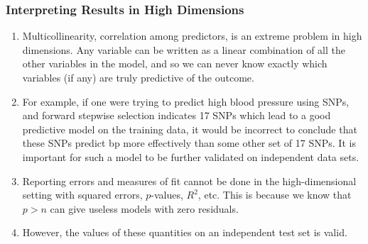 \documentclass[10pt]{article}
\begin{document}
\subsubsection{Interpreting Results in High Dimensions}
\begin{enumerate}
	\item Multicollinearity, correlation among predictors, is an extreme problem in high dimensions.  Any variable can be written as a linear combination of all the other variables in the model, and so we can never know exactly which variables (if any) are truly predictive of the outcome.
	\item For example, if one were trying to predict high blood pressure using SNPs, and forward stepwise selection indicates 17 SNPs which lead to a good predictive model on the training data, it would be incorrect to conclude that these SNPs predict bp more effectively than some other set of 17 SNPs.  It is important for such a model to be further validated on independent data sets.
	\item Reporting errors and measures of fit cannot be done in the high-dimensional setting with squared errors, $p$-values, $R^2$, etc.  This is because we know that $p > n$ can give useless models with zero residuals.  
	\item However, the values of these quantities on an independent test set is valid.
\end{enumerate}
\end{document}
